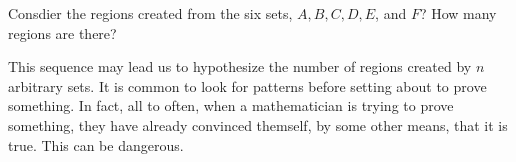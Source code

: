 \begin{problem}
Consdier the regions created from the six sets, $A, B, C, D, E$, and $F$?  How many regions are there?
\end{problem}

This sequence may lead us to hypothesize the number of regions created by $n$ arbitrary sets.  It is common to look for patterns before setting about to prove something.  In fact, all to often, when a mathematician is trying to prove something, they have already convinced themself, by some other means, that it is true.  This can be dangerous.

